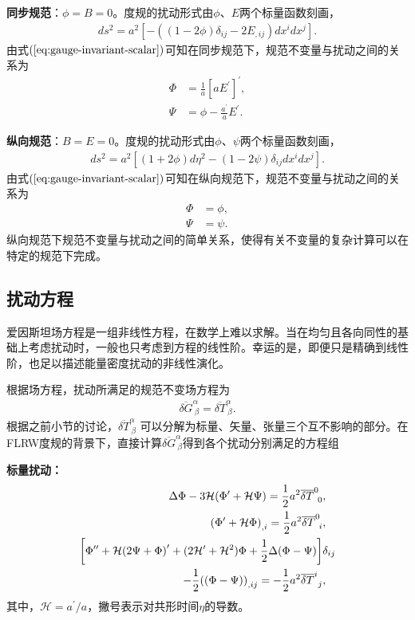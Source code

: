 \textbf{同步规范}：$\phi=B=0$。度规的扰动形式由$\phi$、$E$两个标量函数刻画，
\begin{align}
	\label{eq:synchronous-gauge-metric}
	ds^2=a^2{\left[-((1-2\phi)\delta_{ij}-2E_{,ij})dx^{i}dx^{j}\right]}.
\end{align}
由式$(\ref{eq:gauge-invariant-scalar})$可知在同步规范下，规范不变量与扰动之间的关系为
\begin{align}
	\Phi & =\frac{1}{a}{\left[aE^\prime\right]}^{\prime}, \\
	\Psi & =\phi-\frac{a^\prime}{a}E^\prime.
\end{align}

\textbf{纵向规范}：$B=E=0$。度规的扰动形式由$\phi$、$\psi$两个标量函数刻画，
\begin{align}
	ds^2=a^2{\left[(1+2\phi)d\eta^2-(1-2\psi)\delta_{ij}dx^{i}dx^{j}\right]}.
\end{align}
由式$(\ref{eq:gauge-invariant-scalar})$可知在纵向规范下，规范不变量与扰动之间的关系为
\begin{align}
	\Phi & = \phi,  \\
	\Psi & = \psi.
\end{align}
纵向规范下规范不变量与扰动之间的简单关系，使得有关不变量的复杂计算可以在特定的规范下完成。

\subsection{扰动方程}
爱因斯坦场方程是一组非线性方程，在数学上难以求解。当在均匀且各向同性的基础上考虑扰动时，一般也只考虑到方程的线性阶。幸运的是，即便只是精确到线性阶，也足以描述能量密度扰动的非线性演化。

根据场方程，扰动所满足的规范不变场方程为
\begin{align}
	\label{eq:gauge-invariant-perturbation-equation}
	\overline{\delta G}^{\alpha}_{~\beta}=\overline{\delta
		T}^{\alpha}_{~\beta}.
\end{align}
根据之前小节的讨论，$\overline{\delta
		T}^{\alpha}_{~\beta}$
可以分解为标量、矢量、张量三个互不影响的部分。在FLRW度规的背景下，直接计算$\overline{\delta
		G}^{\alpha}_{~\beta}$得到各个扰动分别满足的方程组

\textbf{标量扰动：}
\begin{align}
  \Delta\Phi-3\mathcal{H}{\left(\Phi^\prime+\mathcal{H}\Psi\right)} =
  \frac{1}{2}a^2\overline{\delta T}^{0}_{\ 0}&, 
  \label{eq:equation-gauge-scalar-perturbation1}\\
  {\left(\Phi^\prime+\mathcal{H}\Phi\right)}_{,i}=\frac{1}{2}
  a^2\overline{\delta T}^{0}_{\ i}&,
  \label{eq:equation-gauge-scalar-perturbation2}\\
    {\left[\Phi^{\prime\prime}+\mathcal{H}{\left(2\Psi+\Phi\right)}^{\prime}+(2\mathcal{H^\prime}+\mathcal{H}^2)\Phi 
+\frac{1}{2}\Delta(\Phi-\Psi)\right]}&\delta_{ij}\notag \\
    -\frac{1}{2}{\left((\Phi-\Psi)\right)}_{,ij} = -\frac{1}{2}
a^2\overline{\delta T}^{i}_{\ j}&,
  \label{eq:equation-gauge-scalar-perturbation3}
\end{align}
其中，$\mathcal{H}=a^\prime /a$，撇号表示对共形时间$\eta$的导数。

